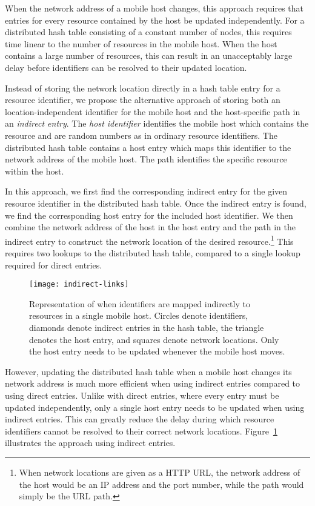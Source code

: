 \documentclass{article}
\begin{document}
When the network address of a mobile host changes, this approach
requires that entries for every resource contained by the host be
updated independently.  For a distributed hash table consisting of a
constant number of nodes, this requires time linear to the number of
resources in the mobile host.  When the host contains a large number
of resources, this can result in an unacceptably large delay before
identifiers can be resolved to their updated location.

Instead of storing the network location directly in a hash table entry
for a resource identifier, we propose the alternative approach of
storing both an location-independent identifier for the mobile host
and the host-specific path in an \emph{indirect entry}.  The
\emph{host identifier} identifies the mobile host which contains the
resource and are random numbers as in ordinary resource identifiers.
The distributed hash table contains a host entry which maps this
identifier to the network address of the mobile host.  The path
identifies the specific resource within the host.

In this approach, we first find the corresponding indirect entry for
the given resource identifier in the distributed hash table.  Once the
indirect entry is found, we find the corresponding host entry for the
included host identifier.  We then combine the network address of the
host in the host entry and the path in the indirect entry to construct
the network location of the desired resource.\footnote{When network
  locations are given as a HTTP URL, the network address of the host
  would be an IP address and the port number, while the path would
  simply be the URL path.}  This requires two lookups to the
distributed hash table, compared to a single lookup required for
direct entries.

\begin{figure}
  \centering
  \texttt{[image: indirect-links]}
  \caption{Representation of when identifiers are mapped indirectly to
    resources in a single mobile host.  Circles denote identifiers,
    diamonds denote indirect entries in the hash table, the triangle
    denotes the host entry, and squares denote network locations.
    Only the host entry needs to be updated whenever the mobile host
    moves.}
  \label{fig:indirect-entries}
\end{figure}

However, updating the distributed hash table when a mobile host
changes its network address is much more efficient when using indirect
entries compared to using direct entries.  Unlike with direct entries,
where every entry must be updated independently, only a single host
entry needs to be updated when using indirect entries.  This can
greatly reduce the delay during which resource identifiers cannot be
resolved to their correct network locations.
Figure~\ref{fig:indirect-entries} illustrates the approach using
indirect entries.
\end{document}

